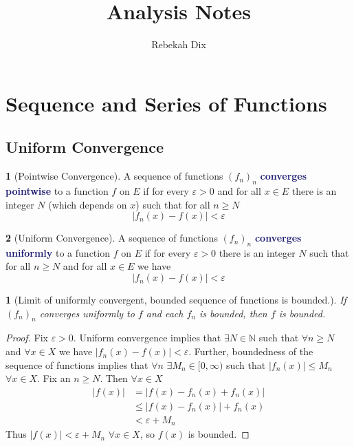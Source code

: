 \documentclass[12pt]{article}
\title{Analysis Notes}
\author{Rebekah Dix}
\numberwithin{equation}{section}
\newcommand{\navy}[1]{\textcolor{MidnightBlue}{\bf #1}}
\theoremstyle{plain}
\newtheorem{theorem}{\color{ForestGreen}{\textbf{Theorem}}}[section]
\theoremstyle{definition}
\newtheorem{definition}{\color{MidnightBlue}{\textbf{Definition}}}[section]
\newcommand{\1}{\mathbbm 1}
\newcommand{\e}{\varepsilon}
\newcommand{\NN}{\mathbb N}
\begin{document}
\maketitle
\tableofcontents
\newpage 

\section{Sequence and Series of Functions}

\subsection{Uniform Convergence}

\begin{definition}[Pointwise Convergence]
	A sequence of functions $(f_n)_n$ \navy{converges pointwise} to a function $f$ on $E$ if for every $\e > 0$ and for all $x \in E$ there is an integer $N$ (which depends on $x$) such that for all $n \geq N$
	\begin{equation*}
		|f_n(x) - f(x)| < \e
	\end{equation*}
\end{definition}

\begin{definition}[Uniform Convergence]
	A sequence of functions $(f_n)_n$ \navy{converges uniformly} to a function $f$ on $E$ if for every $\e > 0$ there is an integer $N$ such that for all $n \geq N$ and for all $x \in E$ we have
	\begin{equation*}
		|f_n(x) - f(x)| < \e
	\end{equation*}
\end{definition}

\begin{theorem}[Limit of uniformly convergent, bounded sequence of functions is bounded.]
	If $(f_n)_n$ converges uniformly to $f$ and each $f_n$ is bounded, then $f$ is bounded. 
\end{theorem}
\begin{proof}
	Fix $\e > 0$. Uniform convergence implies that $\exists N \in \NN$ such that $\forall n \geq N$ and $\forall x \in X$ we have $|f_n(x) - f(x)| < \e$. Further, boundedness of the sequence of functions implies that $\forall n$ $\exists M_n \in [0,\infty)$ such that $|f_n(x)| \leq M_n$ $\forall x \in X$. Fix an $n \geq N$. Then $\forall x \in X$
	\begin{align*}
		|f(x)| &= |f(x) - f_n(x) + f_n(x)| \\
		&\leq |f(x) - f_n(x)| + f_n(x) \tag{trianlge inequality} \\
		& < \e + M_n \tag{uniform convergence and boundedness}
	\end{align*}
	Thus $|f(x)| < \e + M_n$ $\forall x \in X$, so $f(x)$ is bounded.
\end{proof}
\end{document}
